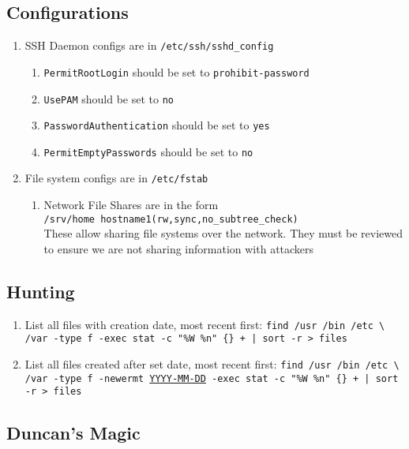 \documentclass[12pt,letterpaper]{article}
\def\code#1{\textcolor{iris}{\texttt{#1}}}
\def\ul#1{\underline{#1}}
\begin{document}
\subsection{Configurations}

\begin{enumerate}
	\item SSH Daemon configs are in \code{/etc/ssh/sshd\_config}
		\begin{enumerate}
			\item \code{PermitRootLogin} should be set to \code{prohibit-password}
			\item \code{UsePAM} should be set to \code{no}
			\item \code{PasswordAuthentication} should be set to \code{yes}
			\item \code{PermitEmptyPasswords} should be set to \code{no}
		\end{enumerate}
	\item File system configs are in \code{/etc/fstab}
		\begin{enumerate}
			\item Network File Shares are in the form \\
				\code{/srv/home    hostname1(rw,sync,no\_subtree\_check)} \\
				These allow sharing file systems over the network.  They must be reviewed to ensure we are not sharing information with attackers
		\end{enumerate}
\end{enumerate}

\subsection{Hunting}

\begin{enumerate}
	\item List all files with creation date, most recent first: \code{find /usr /bin /etc \textbackslash \\
		/var -type f -exec stat -c "\%W \%n" \{\} + | sort -r > files}
	\item List all files created after set date, most recent first: \code{find /usr /bin /etc \textbackslash \\
		/var -type f -newermt \ul{YYYY-MM-DD} -exec stat -c "\%W \%n" \{\} + | sort -r > files}
\end{enumerate}

\subsection{Duncan's Magic}
\label{subsec:dmagic}
\end{document}
